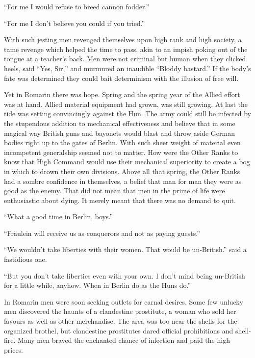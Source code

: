 ``For me I would refuse to breed cannon fodder.''

``For me I don't believe you could if you tried.''

With such jesting men revenged themselves upon high rank and high society, a tame revenge which helped the time to pass, akin to an impish poking out of the tongue at a teacher's back. Men were not criminal but human when they clicked heels, said ``Yes, Sir,'' and murmured an inaudible ``Bloddy bastard.'' If the body's fate was determined they could bait determinism with the illusion of free will.

Yet in Romarin there was hope. Spring and the spring year of the Allied effort was at hand. Allied material equipment had grown, was still growing. At last the tide was setting convincingly against the Hun. The army could still be infected by the stupendous addition to mechanical effectiveness and believe that in some magical way British guns and bayonets would blast and throw aside German bodies right up to the gates of Berlin. With such sheer weight of material even incompetent generalship seemed not to matter. How were the Other Ranks to know that High Command would use their mechanical superiority to create a bog in which to drown their own divisions. Above all that spring, the Other Ranks had a sombre confidence in themselves, a belief that man for man they were as good as the enemy. That did not mean that men in the prime of life were enthusiastic about dying. It merely meant that there was no demand to quit.

``What a good time in Berlin, boys.''

``Fr\"{a}ulein will receive us as conquerors and not as paying guests.''

``We wouldn't take liberties with their women. That would be un-British.'' said a fastidious one.

``But you don't take liberties even with your own. I don't mind being un-British for a little while, anyhow. When in Berlin do as the Huns do.''

In Romarin men were soon seeking outlets for carnal desires. Some few unlucky men discovered the haunts of a clandestine prostitute, a woman who sold her favours as well as other merchandise. The area was too near the shells for the organized brothel, but clandestine prostitutes dared official prohibitions and shell-fire. Many men braved the enchanted chance of infection and paid the high prices.